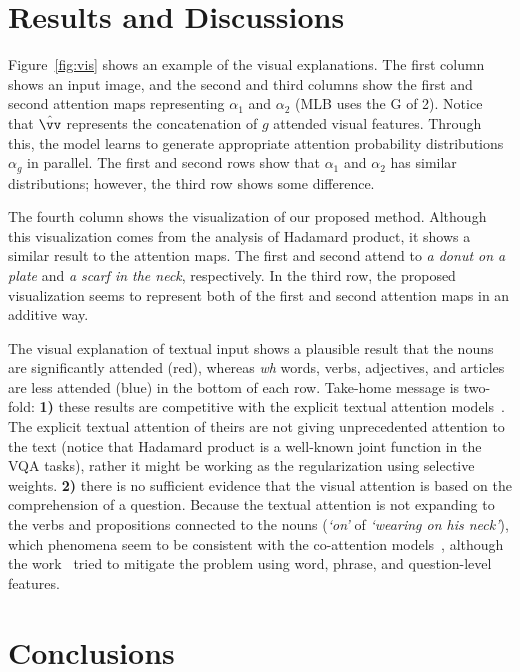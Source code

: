\documentclass{article}
\begin{document}
\section{Results and Discussions}

Figure~\ref{fig:vis} shows an example of the visual explanations. The first column shows an input image, and the second and third columns show the first and second attention maps representing $\alpha_1$ and $\alpha_2$ (MLB uses the G of 2). Notice that $\hat{\vv}$ represents the concatenation of $g$ attended visual features. Through this, the model learns to generate appropriate attention probability distributions $\alpha_g$ in parallel. The first and second rows show that $\alpha_1$ and $\alpha_2$ has similar distributions; however, the third row shows some difference.

The fourth column shows the visualization of our proposed method. Although this visualization comes from the analysis of Hadamard product, it shows a similar result to the attention maps. The first and second attend to \textit{a donut on a plate} and \textit{a scarf in the neck}, respectively. In the third row, the proposed visualization seems to represent both of the first and second attention maps in an additive way.

The visual explanation of textual input shows a plausible result that the nouns are significantly attended (red), whereas \textit{wh} words, verbs, adjectives, and articles are less attended (blue) in the bottom of each row. Take-home message is two-fold: \textbf{1)} these results are competitive with the explicit textual attention models~\cite{Nam2016,Lu2016}. The explicit textual attention of theirs are not giving unprecedented attention to the text (notice that Hadamard product is a well-known joint function in the VQA tasks), rather it might be working as the regularization using selective weights. \textbf{2)} there is no sufficient evidence that the visual attention is based on the comprehension of a question. Because the textual attention is not expanding to the verbs and propositions connected to the nouns (\eg \textit{`on'} of \textit{`wearing on his neck'}), which phenomena seem to be consistent with the co-attention models~\cite{Nam2016,Lu2016}, although the work~\cite{Lu2016} tried to mitigate the problem using word, phrase, and question-level features.

\section{Conclusions}
\end{document}
